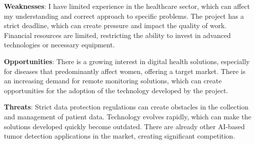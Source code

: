 \textbf{Weaknesses}:
I have limited experience in the healthcare sector, which can affect my understanding and correct approach to specific problems. The project has a strict deadline, which can create pressure and impact the quality of work. Financial resources are limited, restricting the ability to invest in advanced technologies or necessary equipment.

\textbf{Opportunities}:
There is a growing interest in digital health solutions, especially for diseases that predominantly affect women, offering a target market. There is an increasing demand for remote monitoring solutions, which can create opportunities for the adoption of the technology developed by the project.

\textbf{Threats}:
Strict data protection regulations can create obstacles in the collection and management of patient data. Technology evolves rapidly, which can make the solutions developed quickly become outdated. There are already other AI-based tumor detection applications in the market, creating significant competition.
